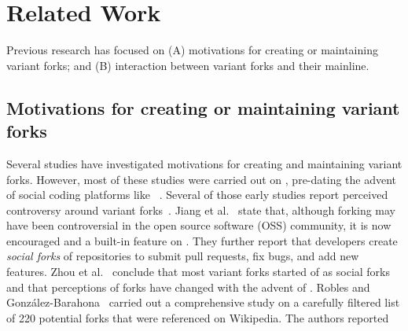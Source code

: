 
\section{Related Work}
\label{sec:background}
Previous research has focused on (A) motivations for creating or maintaining variant forks; and (B) interaction between variant forks and their mainline.%



\subsection{Motivations for creating or maintaining variant forks}
\label{sec:motivations}

Several studies have investigated motivations for creating and maintaining variant forks. However, most of these studies were carried out on \sourceforge, pre-dating the advent of social coding platforms like \gh~\cite{Linus:2012Perspectives,Gregorio:2012,Viseur:2012Forks,Linus:2013CodeForking,Laurent:2008,Linus:2011ToFork}. Several of those early studies report 
perceived controversy 
around variant forks~\cite{Chua:Forking:2017,Dixion:2009Forks,Ernst:2010,Linus:2011ToFork,Linus:2014Hackers,Raymond:Cathedral:2001,pete}.
Jiang et al.~\cite{Lo:2017} state that, although forking may have been controversial in the open source software (OSS) community, it is now encouraged and a built-in feature on \gh. They further report that developers create \emph{social forks} of repositories to submit pull requests, fix bugs, and add new features. Zhou et al.~\cite{Zhou:2020} conclude that most variant forks started of as social forks
and that perceptions of forks have changed with the advent of \gh.
Robles and Gonz{\'a}lez-Barahona~\cite{Gregorio:2012} carried out a comprehensive study on a carefully filtered list of 220 potential forks that were referenced on Wikipedia. The authors reported

